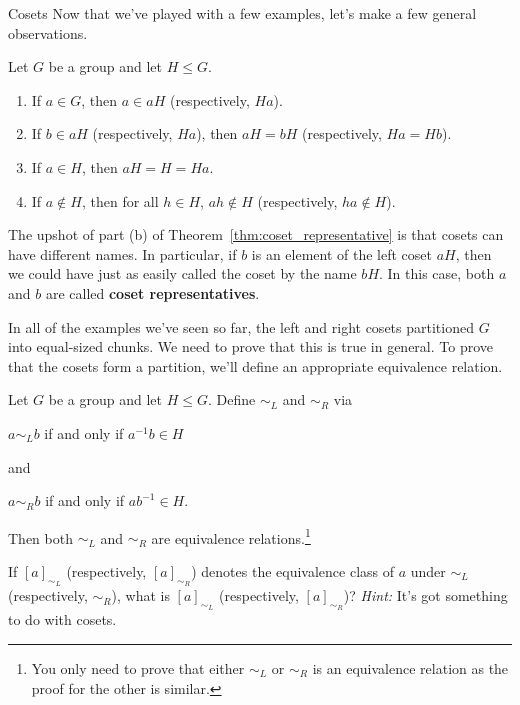 \begin{section}{Cosets}
Now that we've played with a few examples, let's make a few general observations.

\begin{theorem}\label{thm:coset_representative}
Let $G$ be a group and let $H\leq G$.
\begin{enumerate}[label=\rm{(\alph*)}]
\item If $a\in G$, then $a\in aH$ (respectively, $Ha$).
\item If $b\in aH$ (respectively, $Ha$), then $aH=bH$ (respectively, $Ha=Hb$).
\item If $a\in H$, then $aH=H=Ha$.
\item If $a\notin H$, then for all $h\in H$, $ah\notin H$ (respectively, $ha \notin H$).
\end{enumerate}
\end{theorem}

The upshot of part (b) of Theorem~\ref{thm:coset_representative} is that cosets can have different names.  In particular, if $b$ is an element of the left coset $aH$, then we could have just as easily called the coset by the name $bH$.  In this case, both $a$ and $b$ are called \textbf{coset representatives}.

In all of the examples we've seen so far, the left and right cosets partitioned $G$ into equal-sized chunks.  We need to prove that this is true in general.  To prove that the cosets form a partition, we'll define an appropriate equivalence relation.

\begin{theorem}
Let $G$ be a group and let $H\leq G$.  Define $\sim_L$ and $\sim_R$ via 
\begin{center}
$a\sim_L b$ if and only if $a^{-1}b\in H$
\end{center}
and
\begin{center}
$a\sim_R b$ if and only if $ab^{-1}\in H$.
\end{center}
Then both $\sim_L$ and $\sim_R$ are equivalence relations.\footnote{You only need to prove that either $\sim_L$ or $\sim_R$ is an equivalence relation as the proof for the other is similar.}
\end{theorem}

\begin{problem}
If $[a]_{\sim_L}$ (respectively, $[a]_{\sim_R}$) denotes the equivalence class of $a$ under $\sim_L$ (respectively, $\sim_R$), what is $[a]_{\sim_L}$ (respectively, $[a]_{\sim_R}$)?  \emph{Hint:} It's got something to do with cosets.
\end{problem}


\end{section}
